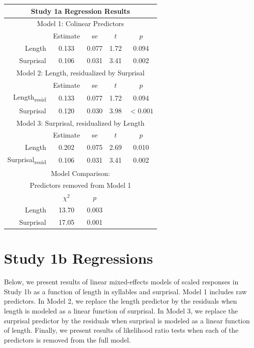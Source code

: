 \begin{appendices}
\vspace{4mm}

\noindent
\footnotesize{
\begin{tabular}{r|cccc}
\hline
\hline
\multicolumn{5}{c}{\textbf{Study 1a Regression Results}} \\
\hline
\hline
\multicolumn{5}{c}{Model 1: Colinear Predictors} \\
& Estimate & se & $t$ & $p$ \\
\hline
Length & 0.133 & 0.077 & 1.72 & 0.094 \\
Surprisal & 0.106 & 0.031 & 3.41 & 0.002 \\
\hline
\hline
\multicolumn{5}{c}{Model 2: Length, residualized by Surprisal} \\
& Estimate & se & $t$ & $p$ \\
\hline
Length\textsubscript{resid} & 0.133 & 0.077 & 1.72 & 0.094 \\
Surprisal & 0.120 & 0.030 & 3.98 & $<0.001$ \\
\hline
\hline
\multicolumn{5}{c}{Model 3: Surprisal, residualized by Length} \\
& Estimate & se & $t$ & $p$ \\
\hline
Length & 0.202 & 0.075 & 2.69 & 0.010 \\
Surprisal\textsubscript{resid} & 0.106 & 0.031 & 3.41 & 0.002 \\
\hline
\hline
\multicolumn{5}{c}{Model Comparison:} \\
\multicolumn{5}{c}{Predictors removed from Model 1} \\
& $\chi^2$ & $p$ \\
\hline
Length & 13.70 & 0.003 \\
Surprisal & 17.05 & 0.001 \\
\hline
\hline
\end{tabular}
}



\section{Study 1b Regressions}

Below, we present results of linear mixed-effects models of scaled responses in Study 1b as a function of length in syllables and surprisal.
Model 1 includes raw predictors.
In Model 2, we replace the length predictor by the residuals when length is modeled as a linear function of surprisal.
In Model 3, we replace the surprisal predictor by the residuals when surprisal is modeled as a linear function of length.
Finally, we present results of likelihood ratio tests when each of the predictors is removed from the full model.


\end{appendices}
